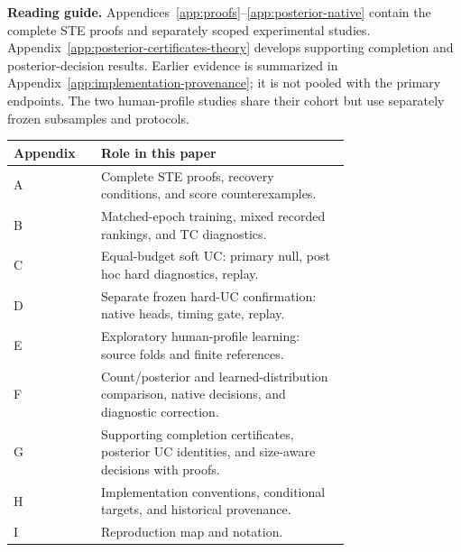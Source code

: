 \noindent\textbf{Reading guide.} Appendices~\ref{app:proofs}--\ref{app:posterior-native} contain the complete STE proofs and separately scoped experimental studies. Appendix~\ref{app:posterior-certificates-theory} develops supporting completion and posterior-decision results. Earlier evidence is summarized in Appendix~\ref{app:implementation-provenance}; it is not pooled with the primary endpoints. The two human-profile studies share their cohort but use separately frozen subsamples and protocols.
\begin{center}\small
\begin{tabular}{@{}lp{0.74\linewidth}@{}}\toprule
Appendix & Role in this paper\\\midrule
A & Complete STE proofs, recovery conditions, and score counterexamples.\\
B & Matched-epoch training, mixed recorded rankings, and TC diagnostics.\\
C & Equal-budget soft UC: primary null, post hoc hard diagnostics, replay.\\
D & Separate frozen hard-UC confirmation: native heads, timing gate, replay.\\
E & Exploratory human-profile learning: source folds and finite references.\\
F & Count/posterior and learned-distribution comparison, native decisions, and diagnostic correction.\\
G & Supporting completion certificates, posterior UC identities, and size-aware decisions with proofs.\\
H & Implementation conventions, conditional targets, and historical provenance.\\
I & Reproduction map and notation.\\\bottomrule
\end{tabular}
\end{center}
